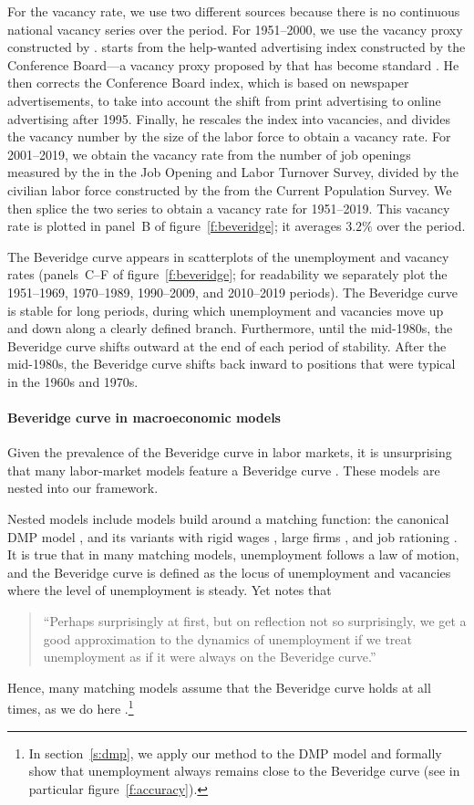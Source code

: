 \documentclass[letterpaper,12pt,leqno]{article}
\begin{document}
For the vacancy rate, we use two different sources because there is no continuous national vacancy series over the period. For 1951--2000, we use the vacancy proxy constructed by .  starts from the help-wanted advertising index constructed by the Conference Board---a vacancy proxy proposed by  that has become standard . He then corrects the Conference Board index, which is based on newspaper advertisements, to take into account the shift from print advertising to online advertising after 1995. Finally, he rescales the index into vacancies, and divides the vacancy number by the size of the labor force to obtain a vacancy rate. For 2001--2019, we obtain the vacancy rate from the number of job openings measured by the  in the Job Opening and Labor Turnover Survey, divided by the civilian labor force constructed by the  from the Current Population Survey. We then splice the two series to obtain a vacancy rate for 1951--2019. This vacancy rate is plotted in panel~B of figure~\ref{f:beveridge}; it averages $3.2\%$ over the period.

The Beveridge curve appears in scatterplots of the unemployment and vacancy rates (panels~C--F of figure~\ref{f:beveridge}; for readability we separately plot the 1951--1969, 1970--1989, 1990--2009, and 2010--2019 periods). The Beveridge curve is stable for long periods, during which unemployment and vacancies move up and down along a clearly defined branch. Furthermore, until the mid-1980s, the Beveridge curve shifts outward at the end of each period of stability. After the mid-1980s, the Beveridge curve shifts back inward to positions that were typical in the 1960s and 1970s.

\paragraph{Beveridge curve in macroeconomic models} Given the prevalence of the Beveridge curve in labor markets, it is unsurprising that many labor-market models feature a Beveridge curve . These models are nested into our framework. 

Nested models include models build around a matching function: the canonical DMP model , and its variants with rigid wages , large firms , and job rationing . It is true that in many matching models, unemployment follows a law of motion, and the Beveridge curve is defined as the locus of unemployment and vacancies where the level of unemployment is steady. Yet  notes that
\begin{quote}
``Perhaps surprisingly at first, but on reflection not so surprisingly, we get a good approximation to the dynamics of unemployment if we treat unemployment as if it were always on the Beveridge curve.''
\end{quote}
Hence, many matching models assume that the Beveridge curve holds at all times, as we do here .\footnote{In section~\ref{s:dmp}, we apply our method to the DMP model and formally show that unemployment always remains close to the Beveridge curve (see in particular figure~\ref{f:accuracy}).}
\end{document}
